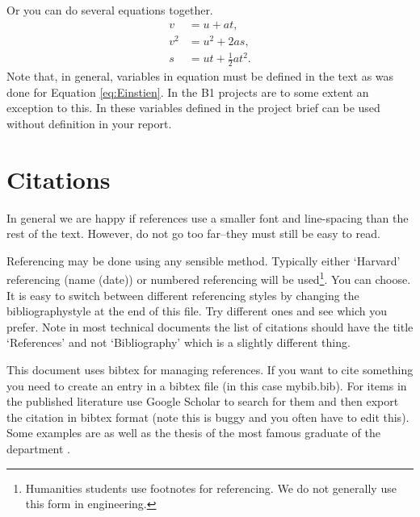 \documentclass[11pt]{article}
\begin{document}
Or you can do several equations together.
\begin{align}
    v&=u+a t,\label{eq:SUVAT1}\\
    v^2&=u^2+2 a s,\\
    s&=ut+\frac{1}{2}at^2.\label{eq:SUVAT3}
\end{align}
Note that, in general, variables in equation must be defined in the text as was done for Equation \ref{eq:Einstien}. In the B1 projects are to some extent an exception to this. In these variables defined in the project brief can be used without definition in your report.



\section{Citations}

In general we are happy if references use a smaller font and line-spacing than the rest of the text. However, do not go too far--they must still be easy to read.

Referencing may be done using any sensible method. Typically either `Harvard' referencing (name (date)) or numbered referencing will be used\footnote{Humanities students use footnotes for referencing. We do not generally use this form in engineering.}. You can choose. It is easy to switch between different referencing styles by changing the bibliographystyle at the end of this file. Try different ones and see which you prefer. Note in most technical documents the list of citations should have the title `References' and not `Bibliography' which is a slightly different thing.

This document uses bibtex for managing references. If you want to cite something you need to create an entry in a bibtex file (in this case mybib.bib). For items in the published literature use Google Scholar to search for them and then export the citation in bibtex format (note this is buggy and you often have to edit this). Some examples are  \cite{WilliamsTodd,coussios2008applications,mei2009constant} as well as the thesis of the most famous graduate of the department \cite{RowanAtkinsonthesis}. 


\begingroup\onehalfspacing
{\small
\begin{multicols}{2}

%
% 
% 
% 
% 
% 
% 
% 
% 
% 
% 
% 
% 

\end{multicols}}
\endgroup
\end{document}
